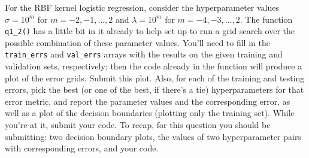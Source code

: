 \documentclass{article}
\newcommand{\blu}[1]{{\textcolor{blu}{#1}}}
\let\ask\blu
\begin{document}
For the RBF kernel logistic regression, consider the hyperparameter values $\sigma=10^m$ for $m=-2,-1,\ldots,2$ and $\lambda=10^m$ for $m=-4,-3,\ldots,2$.
The function \verb|q1_2()| has a little bit in it already to help set up to run a grid search over the possible combination of these parameter values.
You'll need to fill in the \verb|train_errs| and \verb|val_errs| arrays
with the results on the given training and validation sets, respectively;
then the code already in the function will produce a plot of the error grids.
\ask{Submit this plot}.
Also, for each of the training and testing errors,
pick the best (or one of the best, if there's a tie) hyperparameters for that error metric,
and \ask{report the parameter values and the corresponding error, as well as a plot of the decision boundaries (plotting only the training set)}.
While you're at it, \ask{submit your code}.
To recap, for this question you should be submitting:
two decision boundary plots,
the values of two hyperparameter pairs with corresponding errors,
and your code.
\end{document}

